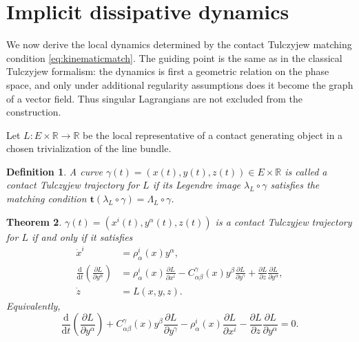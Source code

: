 \documentclass[11pt]{article}
\newtheorem{theorem}{Theorem}[section]
\newtheorem{definition}[theorem]{Definition}
\newcommand{\R}{\mathbb{R}}
\newcommand{\dd}{\mathrm{d}}
\begin{document}
\section{Implicit dissipative dynamics}
\label{sec:dynamics}

We now derive the local dynamics determined by the contact Tulczyjew
matching condition \eqref{eq:kinematicmatch}.
The guiding point is the same as in the classical Tulczyjew formalism:
the dynamics is first a geometric relation on the phase space, and only
under additional regularity assumptions does it become the graph of a
vector field. Thus singular Lagrangians are not excluded from the
construction.

Let $L:E\times\R\longrightarrow\R$ be the local representative of a contact generating object in a chosen
trivialization of the line bundle. 

\begin{definition}
A curve $\gamma(t)=(x(t),y(t),z(t))\in E\times\R$ is called a \emph{contact Tulczyjew trajectory} for \(L\) if its
Legendre image \(\lambda_L\circ\gamma\) satisfies the matching condition $\mathbf t(\lambda_L\circ\gamma)=\Lambda_L\circ\gamma$.
\end{definition}

\begin{theorem}
\label{thm:implicitdynamics} $\gamma(t)=(x^i(t),y^\alpha(t),z(t))$ is a contact Tulczyjew
trajectory for \(L\) if and only if it satisfies
\begin{align}
\dot x^i
&=
\rho^i_{\alpha}(x)y^\alpha,
\label{eq:ELH1}
\\
\frac{\dd}{\dd t}
\left(
\frac{\partial L}{\partial y^\alpha}
\right)
&=
\rho^i_{\alpha}(x)\frac{\partial L}{\partial x^i}
-
C^\gamma_{\alpha\beta}(x)y^\beta
\frac{\partial L}{\partial y^\gamma}
+
\frac{\partial L}{\partial z}
\frac{\partial L}{\partial y^\alpha},
\label{eq:ELH2}
\\
\dot z
&=
L(x,y,z).
\label{eq:ELH3}
\end{align}
Equivalently,
\begin{equation}
\frac{\dd}{\dd t}
\left(
\frac{\partial L}{\partial y^\alpha}
\right)
+
C^\gamma_{\alpha\beta}(x)y^\beta
\frac{\partial L}{\partial y^\gamma}
-
\rho^i_{\alpha}(x)\frac{\partial L}{\partial x^i}
-
\frac{\partial L}{\partial z}
\frac{\partial L}{\partial y^\alpha}
=
0.
\label{eq:ELHfinal}
\end{equation}
\end{theorem}
\end{document}
